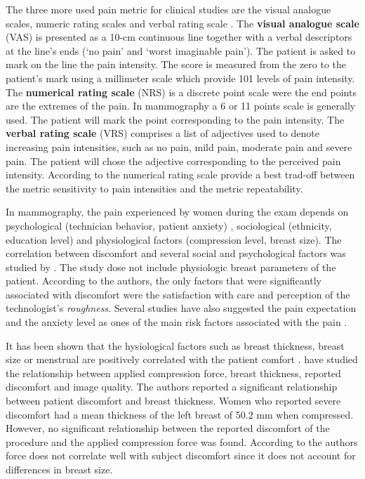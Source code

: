 The three more used pain metric for clinical studies are the visual analogue scales, numeric rating scales and verbal rating scale \citep{williamson_pain_2005}. The \textbf{visual analogue scale} (VAS) is presented as a 10-cm continuous line together with a verbal descriptors at the line's ends (‘no pain’ and ‘worst imaginable pain'). The patient is asked to mark on the line the pain intensity. The score is measured from the zero to the patient's mark using a millimeter scale which provide 101 levels of pain intensity. The \textbf{numerical rating scale} (NRS) is a discrete point scale were the end points are the extremes of the pain. In mammography a 6 or 11 points scale is generally used.  The patient will mark the point corresponding to the pain intensity. The \textbf{verbal rating scale} (VRS) comprises a list of adjectives used to denote increasing pain intensities, such as no pain, mild pain, moderate pain and severe pain. The patient will chose the adjective corresponding to the perceived pain intensity. According to \citep{williamson_pain_2005} the numerical rating scale  provide a best trad-off between the metric sensitivity to pain intensities and the metric repeatability.     

In mammography, the pain experienced by women during the exam depends on psychological  (technician behavior, patient anxiety) \citep{aro_pain_1996}, sociological  (ethnicity, education level) \citep{dullum_rates_2000} and physiological factors (compression level, breast size)\citep{poulos_breast_2003}.  The correlation between discomfort and several social and psychological factors was studied by  \cite{dullum_rates_2000}.  The study dose not include physiologic breast parameters of the patient. According to the authors, the only factors that were significantly associated with discomfort were the satisfaction with care and perception of the technologist's \textit{roughness}. Several studies have also suggested the pain expectation and the anxiety level as ones of the main risk factors associated with the pain \citep{aro_pain_1996,williamson_pain_2005,keemers_pain_2000,askhar_female_2017}.   

It has been shown that the hysiological factors such as breast thickness, breast size or menstrual are positively correlated with the patient comfort \citep{keemers_pain_2000,hafslund_mammography_2000}. \citep{poulos_breast_2003} have studied the relationship between applied compression force, breast thickness, reported discomfort and image quality. The authors reported  a significant relationship  between patient  discomfort and breast thickness. Women who reported severe discomfort had a mean thickness of the left breast of 50.2 mm when compressed. However,  no significant relationship between the reported discomfort of the procedure and the applied compression force was found. According to the authors  force does not correlate well with subject discomfort since it does not account for differences in breast size.
 
